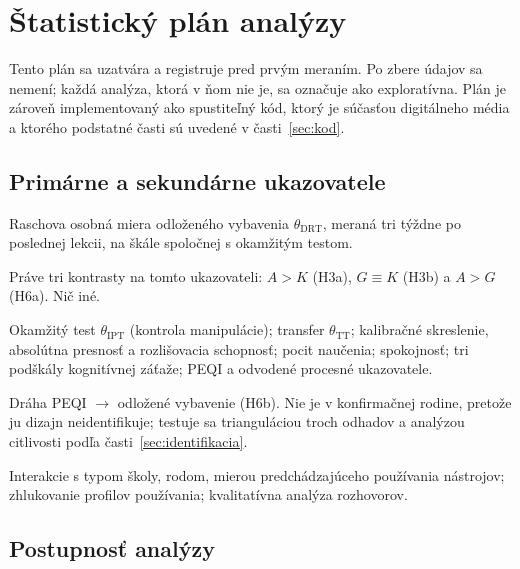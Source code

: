 \chapter{Štatistický plán analýzy}
\label{chapter:sap}

Tento plán sa uzatvára a registruje pred prvým meraním. Po zbere údajov sa nemení; každá analýza, ktorá v ňom nie je, sa označuje ako exploratívna. Plán je zároveň implementovaný ako spustiteľný kód, ktorý je súčasťou digitálneho média a ktorého podstatné časti sú uvedené v časti~\ref{sec:kod}.

\section{Primárne a sekundárne ukazovatele}

\begin{description}[leftmargin=2.7cm, style=nextline, nosep]
    \item[Primárny] Raschova osobná miera odloženého vybavenia $\theta_{\mathrm{DRT}}$, meraná tri týždne po poslednej lekcii, na škále spoločnej s okamžitým testom.
    \item[Konfirmačné] Práve tri kontrasty na tomto ukazovateli: $A>K$ (H3a), $G\equiv K$ (H3b) a $A>G$ (H6a). Nič iné.
    \item[Sekundárne] Okamžitý test $\theta_{\mathrm{IPT}}$ (kontrola manipulácie); transfer $\theta_{\mathrm{TT}}$; kalibračné skreslenie, absolútna presnosť a rozlišovacia schopnosť; pocit naučenia; spokojnosť; tri podškály kognitívnej záťaže; PEQI a odvodené procesné ukazovatele.
    \item[Mechanistické] Dráha PEQI $\to$ odložené vybavenie (H6b). Nie je v konfirmačnej rodine, pretože ju dizajn neidentifikuje; testuje sa trianguláciou troch odhadov a analýzou citlivosti podľa časti~\ref{sec:identifikacia}.
    \item[Exploratívne] Interakcie s typom školy, rodom, mierou predchádzajúceho používania nástrojov; zhlukovanie profilov používania; kvalitatívna analýza rozhovorov.
\end{description}

\section{Postupnosť analýzy}

